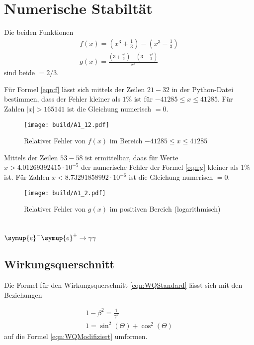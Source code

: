 



\section{Numerische Stabiltät}
Die beiden Funktionen
\begin{gather}
  f(x)=\left(x^3+\frac{1}{3}\right)-\left(x^3-\frac{1}{3}\right)\label{eqn:f}\\
  g(x)=\frac{\left(3+\frac{x^3}{3}\right)-\left(3-\frac{x^3}{3}\right)}{x^3}\label{eqn:g}
\end{gather}
sind beide $=2/3$.

\noindent Für Formel \eqref{eqn:f} lässt sich mittels der Zeilen $21-32$ in der Python-Datei bestimmen, dass der Fehler kleiner als $1\%$ ist für $-41285 \leq x \leq 41285$.
Für Zahlen $|x|>165141$ ist die Gleichung numerisch $=0$.

\begin{figure}
  \centering
  \texttt{[image: build/A1\_12.pdf]}
  \caption{Relativer Fehler von $f(x)$ im Bereich $-41285 \leq x \leq 41285$}
  \label{fig:FehlerF}
\end{figure}

\noindent Mittels der Zeilen $53-58$ ist ermittelbar, daas für Werte $x>4.01269392415 \cdot 10^{-5}$ der numerische Fehler der Formel \eqref{eqn:g} kleiner als $1\%$ ist.
Für Zahlen $x<8.73291858992 \cdot 10^{-6}$ ist die Gleichung numerisch $=0$.

\begin{figure}
  \centering
  \texttt{[image: build/A1\_2.pdf]}
  \caption{Relativer Fehler von $g(x)$ im positiven Bereich (logarithmisch)}
  \label{fig:FehlerGlog}
\end{figure}

\section{\texorpdfstring{$\symup{e}^-\symup{e}^+\rightarrow\gamma \gamma$}{Paarvernichtung}}
\subsection{Wirkungsquerschnitt}
Die Formel für den Wirkungsquerschnitt \eqref{eqn:WQStandard} lässt sich mit den Beziehungen

\begin{gather}
  1-\beta^2=\frac{1}{\gamma^2}\nonumber\\
  1=\sin^2(\Theta)+\cos^2(\Theta)\nonumber
\end{gather}
auf die Formel \eqref{eqn:WQModifiziert} umformen.

